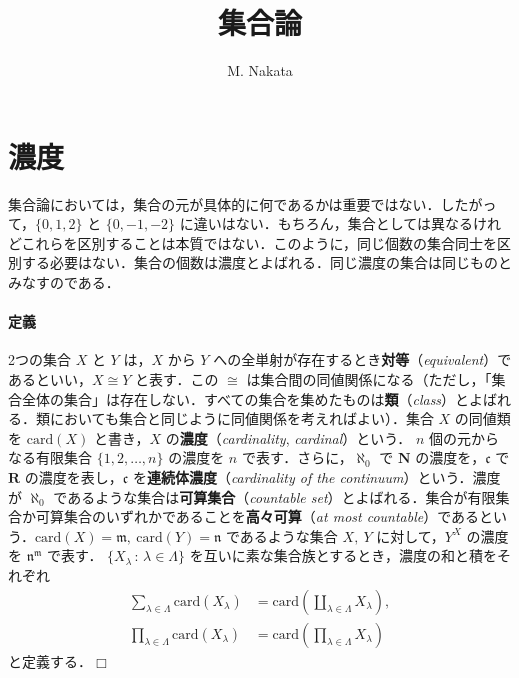 \documentclass[10pt,b5paper,pandoc]{bxjsarticle}
\title{集合論}
\author{M. Nakata}
\date{}
\let\oldparagraph\paragraph
\renewcommand{\paragraph}[1]{\oldparagraph{#1}\mbox{}}
\begin{document}
\maketitle

{
\setcounter{tocdepth}{3}
\tableofcontents
}
\hypertarget{ux6fc3ux5ea6}{%
\section{濃度}\label{ux6fc3ux5ea6}}

集合論においては，集合の元が具体的に何であるかは重要ではない．したがって，\(\{ 0, 1, 2 \}\)
と \(\{ 0, -1, -2 \}\)
に違いはない．もちろん，集合としては異なるけれどこれらを区別することは本質ではない．このように，同じ個数の集合同士を区別する必要はない．集合の個数は濃度とよばれる．同じ濃度の集合は同じものとみなすのである．

\hypertarget{ux5b9aux7fa9}{%
\paragraph{定義}\label{ux5b9aux7fa9}}

2つの集合 \(X\) と \(Y\) は，\(X\) から \(Y\)
への全単射が存在するとき\textbf{対等}（\emph{equivalent}）であるといい，\(X \cong Y\)
と表す．この \(\cong\)
は集合間の同値関係になる（ただし，「集合全体の集合」は存在しない．すべての集合を集めたものは\textbf{類}（\emph{class}）とよばれる．類においても集合と同じように同値関係を考えればよい）．集合
\(X\) の同値類を \(\mathrm{card}(X)\) と書き，\(X\)
の\textbf{濃度}（\emph{cardinality}, \emph{cardinal}）という． \(n\)
個の元からなる有限集合 \(\{1, 2, \dotsc, n \}\) の濃度を \(n\)
で表す．さらに，\(\aleph_0\) で \(\boldsymbol N\)
の濃度を，\(\mathfrak c\) で \(\boldsymbol R\)
の濃度を表し，\(\mathfrak c\) を\textbf{連続体濃度}（\emph{cardinality
of the continuum}）という．濃度が \(\aleph_0\)
であるような集合は\textbf{可算集合}（\emph{countable
set}）とよばれる．集合が有限集合か可算集合のいずれかであることを\textbf{高々可算}（\emph{at
most
countable}）であるという．\(\mathrm{card}(X) = \mathfrak m,\ \mathrm{card}(Y) = \mathfrak n\)
であるような集合 \(X,\ Y\) に対して，\(Y^X\) の濃度を
\(\mathfrak n^{\mathfrak m}\) で表す．
\(\{ X_\lambda \,:\,\lambda \in \Lambda \}\)
を互いに素な集合族とするとき，濃度の和と積をそれぞれ \begin{align*}
\sum_{\lambda \in \Lambda} \mathrm{card}(X_\lambda) &= \mathrm{card}(\coprod_{\lambda \in \Lambda} X_\lambda),\\
\prod_{\lambda \in \Lambda} \mathrm{card}(X_\lambda) &= \mathrm{card}(\prod_{\lambda \in \Lambda} X_\lambda)
\end{align*} と定義する．\(\Box\)
\end{document}
